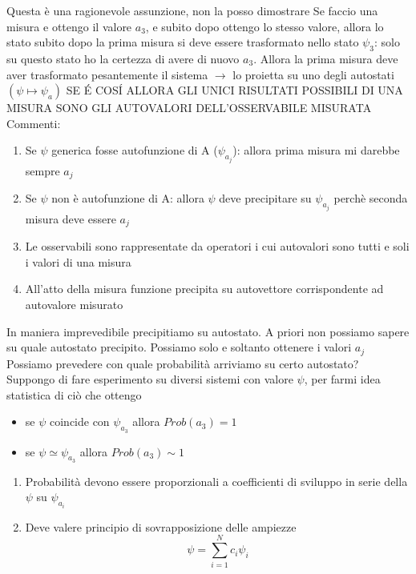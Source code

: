 \documentclass[a4paper,11pt]{report}
\theoremstyle{remark}
\theoremstyle{definition}
\begin{document}
Questa è una ragionevole assunzione, non la posso dimostrare \newline
Se faccio una misura e ottengo il valore $a_3$, e subito dopo ottengo lo stesso valore, allora lo stato subito dopo la prima misura si deve essere trasformato nello stato $\psi_3$: solo su questo stato ho la certezza di avere di nuovo $a_3$. Allora la prima misura deve aver trasformato pesantemente il sistema $\rightarrow$ lo proietta su uno degli autostati $(\psi \mapsto \psi_a)$ \newline
SE \'E COS\'I ALLORA GLI UNICI RISULTATI POSSIBILI DI UNA MISURA SONO GLI AUTOVALORI DELL'OSSERVABILE MISURATA \newline
Commenti:
\begin{enumerate}
    \item Se $\psi$ generica fosse autofunzione di A ($\psi_{a_j}$): allora prima misura mi darebbe sempre $a_j$
    \item Se $\psi$ non è autofunzione di A: allora $\psi$ deve precipitare su $\psi_{a_j}$ perchè seconda misura deve essere $a_j$
    \item Le osservabili sono rappresentate da operatori i cui autovalori sono tutti e soli i valori di una misura
    \item All'atto della misura funzione precipita su autovettore corrispondente ad autovalore misurato
\end{enumerate}
In maniera imprevedibile precipitiamo su autostato. A priori non possiamo sapere su quale autostato precipito. Possiamo solo e soltanto ottenere i valori $a_j$ \newline
Possiamo prevedere con quale probabilità arriviamo su certo autostato? \newline
Suppongo di fare esperimento su diversi sistemi con valore $\psi$, per farmi idea statistica di ciò che ottengo
\begin{itemize}
    \item se $\psi$ coincide con $\psi_{a_3}$ allora $Prob(a_3)=1$
    \item se $\psi \simeq \psi_{a_3}$ allora $Prob(a_3)\sim 1$
\end{itemize}
\begin{enumerate}
    \item Probabilità devono essere proporzionali a coefficienti di sviluppo in serie della $\psi$ su $\psi_{a_i}$
    \item Deve valere principio di sovrapposizione delle ampiezze
    \begin{equation*}
        \psi = \sum_{i=1}^N c_i\psi_i
    \end{equation*}
\end{enumerate}
\end{document}
